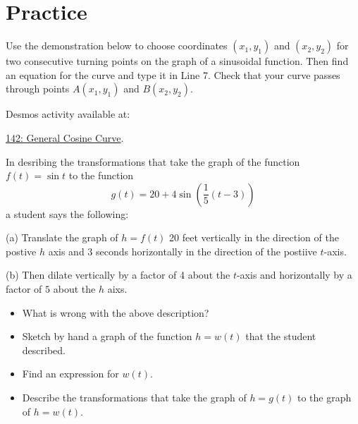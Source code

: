 \documentclass{ximera}
\begin{document}
\section{Practice}

\begin{exploration}   \label{Edsgtjnh}
Use the demonstration below to choose coordinates $(x_1, y_1)$ and $(x_2,y_2)$ for two consecutive turning points on the graph of a sinusoidal function. Then find an equation for the curve and type it in Line 7. Check that your curve passes through points $A(x_1, y_1)$ and $B(x_2, y_2)$.

Desmos activity available at:

\href{https://www.desmos.com/calculator/rkpaftabkl}{142: General Cosine Curve}.

 
\begin{onlineOnly}
    \begin{center}
\end{center}
\end{onlineOnly}

\end{exploration}



\begin{question} \label{Exsdfdsf:Graphs}
In desribing the transformations that take the graph of the function $f(t) = \sin t$ to the function
\[
  g(t) = 20 + 4 \sin \left( \frac{1}{5}(t-3) \right) 
\]
a student says the following:

(a) Translate the graph of $h=f(t)$ 20 feet vertically in the direction of the postive $h$ axis and $3$ seconds horizontally in the direction of the postiive $t$-axis.

(b) Then dilate vertically by a factor of 4 about the $t$-axis and horizontally by a factor of $5$ about the $h$ aixs.


\begin{itemize}
\item{What is wrong with the above description?}

\item{Sketch by hand a graph of the function $h=w(t)$ that the student described.}

\item{Find an expression for $w(t)$.}

\item{Describe the transformations that take the graph of $h=g(t)$ to the graph of $h=w(t)$.}

\end{itemize}

\end{question}
\end{document}
